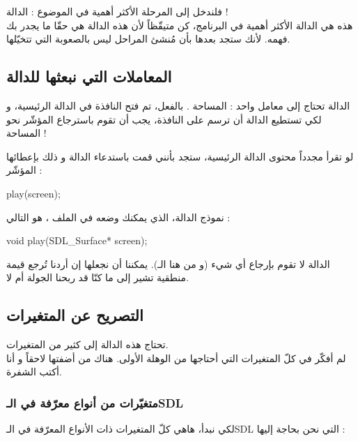 فلندخل إلى المرحلة الأكثر أهمية في الموضوع : الدالة 
 !\\
هذه هي الدالة الأكثر أهمية في البرنامج، كن متيقّظاً لأن هذه الدالة هي حقّا ما يجدر بك فهمه. لأنك ستجد بعدها بأن مُنشئ المراحل ليس بالصعوبة التي تتخيّلها.

\subsection{المعاملات التي نبعثها للدالة}

الدالة
تحتاج إلى معامل واحد : المساحة
.
بالفعل، تم فتح النافذة في الدالة الرئيسية، و لكي تستطيع الدالة
أن ترسم على النافذة، يجب أن تقوم باسترجاع المؤشّر نحو المساحة
 !

لو تقرأ مجدداً محتوى الدالة الرئيسية، ستجد بأنني قمت باستدعاء الدالة
و ذلك بإعطائها المؤشّر
 :

\begin{Csource}
play(screen);
\end{Csource}

نموذج الدالة، الذي يمكنك وضعه في الملف
،
هو التالي :

\begin{Csource}
void play(SDL_Surface* screen);
\end{Csource}

\begin{information}
الدالة لا تقوم بإرجاع أي شيء (و من هنا الـ).
يمكننا أن نجعلها إن أردنا تُرجع قيمة منطقية تشير إلى ما كنّا قد ربحنا الجولة أم لا.
\end{information}

\subsection{التصريح عن المتغيرات}

تحتاج هذه الدالة إلى كثير من المتغيرات.\\
لم أفكّر في كلّ المتغيرات التي أحتاجها من الوهلة الأولى. هناك من أضفتها لاحقاً و أنا أكتب الشفرة.

\subsubsection{متغيّرات من أنواع معرّفة في الـ\textenglish{SDL}}

لكي نبدأ، هاهي كلّ المتغيرات ذات الأنواع المعرّفة في الـ\textenglish{SDL}
التي نحن بحاجة إليها :

